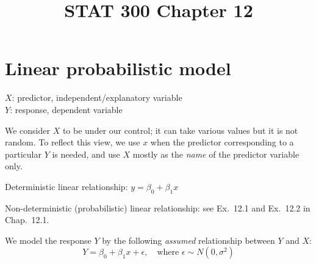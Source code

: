\documentclass[12pt]{article}
\begin{document}
\title{STAT 300 Chapter 12}
\maketitle


\section{Linear probabilistic model}

$X$: predictor, independent/explanatory variable\\
$Y$: response, dependent variable

We consider $X$ to be under our control; it can take various values
but it is not random. To reflect this view,
we use $x$ when the predictor corresponding to a particular $Y$
is needed, and use $X$ mostly as the \emph{name} of the predictor
variable only.

Deterministic linear relationship: $y = \beta_0 + \beta_1x$

Non-deterministic (probabilistic) linear relationship:
see Ex.~12.1 and Ex.~12.2 in Chap.~12.1.

We model the response $Y$ by the following
\emph{assumed} relationship between $Y$ and $X$:
\begin{equation}\label{eq:model}
Y = \beta_0 + \beta_1x + \epsilon,
\quad
\text{where $\epsilon\sim N(0,\sigma^2)$}
\end{equation}
\end{document}

